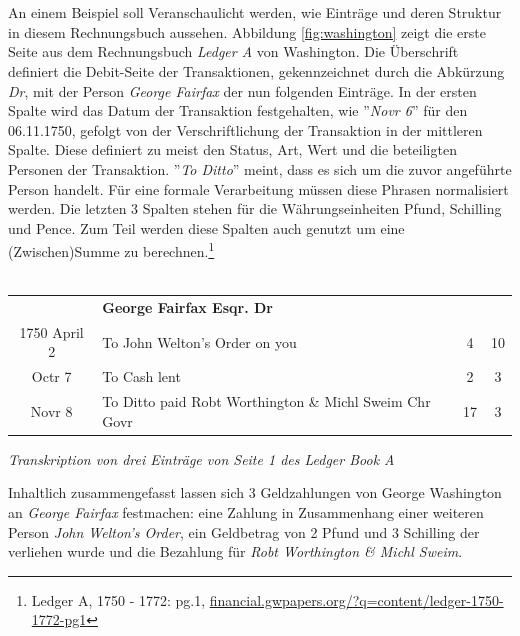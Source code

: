 \documentclass[12pt,a4paper]{article}
\begin{document}
\\
\\
An einem Beispiel soll Veranschaulicht werden, wie Einträge und deren Struktur in diesem Rechnungsbuch aussehen. Abbildung \ref{fig:washington} zeigt die erste Seite aus dem Rechnungsbuch \textit{Ledger A} von Washington. Die Überschrift definiert die Debit-Seite der Transaktionen, gekennzeichnet durch die Abkürzung \textit{Dr}, mit der Person \textit{George Fairfax} der nun folgenden Einträge. In der ersten Spalte wird das Datum der Transaktion festgehalten, wie ''\textit{Novr 6}'' für den 06.11.1750, gefolgt von der Verschriftlichung der Transaktion in der mittleren Spalte. Diese definiert zu meist den Status, Art, Wert und die beteiligten Personen der Transaktion. ''\textit{To Ditto}'' meint, dass es sich um die zuvor angeführte Person handelt. Für eine formale Verarbeitung müssen diese Phrasen normalisiert werden. Die letzten 3 Spalten stehen für die Währungseinheiten Pfund, Schilling und Pence. Zum Teil werden diese Spalten auch genutzt um eine (Zwischen)Summe zu berechnen.\footnote{Ledger A, 1750 - 1772: pg.1, \protect\url{financial.gwpapers.org/?q=content/ledger-1750-1772-pg1}}
\\
\\
\begin{tabular}{clcc}
& \textbf{George Fairfax Esqr. Dr}\\
1750 April 2 & To John Welton's Order on you & 4 & 10\\
Octr 7 & To Cash lent & 2 & 3 \\
Novr 8 & To Ditto paid Robt Worthington \& Michl Sweim Chr Govr &  17 & 3\\
\end{tabular}
\medskip
\begin{center}
\textit{Transkription von drei Einträge von Seite 1 des Ledger Book A}
\end{center}
Inhaltlich zusammengefasst lassen sich 3 Geldzahlungen von George Washington an \textit{George Fairfax} festmachen: eine Zahlung in Zusammenhang einer weiteren Person \textit{John Welton's Order}, ein Geldbetrag von 2 Pfund und 3 Schilling der verliehen wurde und die Bezahlung für \textit{Robt Worthington \& Michl Sweim}.
\end{document}
